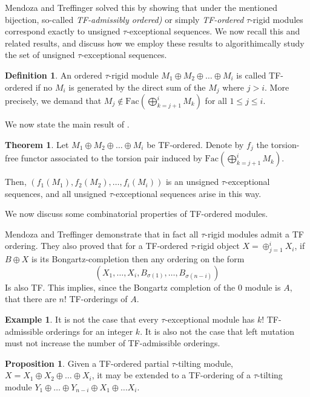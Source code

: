 \documentclass[]{article}
\theoremstyle{definition}
\newtheorem{definition}{Definition}[section]
\newtheorem{theorem}{Theorem}[section]
\newtheorem{proposition}{Proposition}[section]
\newtheorem{example}{Example}[section]
\newcommand{\tu}{\ensuremath{\tau}}
\begin{document}
Mendoza and Treffinger\cite{mendoza2020stratifying} solved this by showing that under the mentioned bijection, so-called \textit{TF-admissibly ordered)} or simply \textit{TF-ordered} \tu-rigid modules correspond exactly to unsigned \tu-exceptional sequences. We now recall this and related results, and discuss how we employ these results to algorithimcally study the set of unsigned \tu-exceptional sequences.

\begin{definition}\cite{mendoza2020stratifying}
	An ordered \tu-rigid module $M_1 \oplus M_2 \oplus \dots \oplus M_i$ is called TF-ordered if no $M_i$ is generated by the direct sum of the $M_j$ where $j > i$. More precisely, we demand that $M_j \notin \text{Fac}(\bigoplus_{k = j+1}^i M_k)$ for all $1 \leq j \leq i$.
\end{definition}

We now state the main result of \cite{mendoza2020stratifying}.

\begin{theorem}\cite{mendoza2020stratifying}\label{tf-to-tau}
	Let $M_1 \oplus M_2 \oplus \dots \oplus M_i$ be TF-ordered. Denote by $f_j$ the torsion-free functor associated to the torsion pair induced by $\text{Fac}(\bigoplus_{k = j+1}^i M_k)$.
	
	Then, $(f_1(M_1),f_2(M_2),\dots,f_i(M_i))$ is an unsigned \tu-exceptional sequences, and all unsigned \tu-exceptional sequences arise in this way.
\end{theorem}

We now discuss some combinatorial properties of TF-ordered modules.

Mendoza and Treffinger demonstrate that in fact all \tu-rigid modules admit a TF ordering. They also proved that for a TF-ordered \tu-rigid object $X = \oplus_{j = 1}^i X_i$, if $B \oplus X$ is its Bongartz-completion then any ordering on the form \[(X_1,\dots,X_i,B_{\sigma(1)},\dots,B_{\sigma(n-i)})\]
Is also TF. This implies, since the Bongartz completion of the $0$ module is $A$, that there are $n!$ TF-orderings of $A$. 

\begin{example}
	It is not the case that every \tu-exceptional module has $k!$ TF-admissible orderings for an integer $k$. It is also not the case that left mutation must not increase the number of TF-admissible orderings.
 \end{example}
\begin{proposition}
	Given a TF-ordered partial \tu-tilting module, $X = X_1 \oplus X_2 \oplus \dots \oplus X_i$, it may be extended to a TF-ordering of a \tu-tilting module $Y_1 \oplus \dots \oplus Y_{n-i} \oplus X_1 \oplus \dots X_i$.
\end{proposition}
\end{document}
